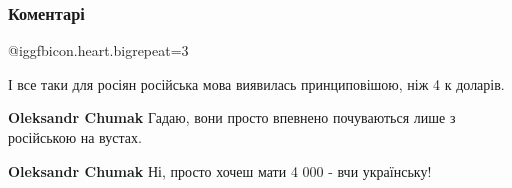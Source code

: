  
 
 
 
 
\subsubsection{Коментарі}

\begin{itemize}

 
@igg{fbicon.heart.big}{repeat=3}


І все таки для росіян російська мова виявилась принциповішою, ніж 4 к доларів.

\begin{itemize}
 
\textbf{Oleksandr Chumak} Гадаю, вони просто впевнено почуваються лише з російською на вустах.

 
\textbf{Oleksandr Chumak} Ні, просто хочеш мати 4 000 - вчи українську! \Smiley[1.0][yellow]

 

\end{itemize}
\end{itemize}
